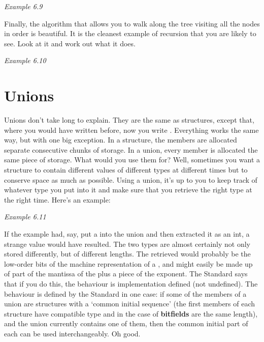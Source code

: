     \begin{center}\textit{Example 6.9}\end{center}


   Finally, the algorithm that allows you to walk along the tree visiting
    all the nodes in order is beautiful. It is the cleanest example of
    recursion that you are likely to see. Look at it and work out what it
    does.


    \begin{center}\textit{Example 6.10}\end{center}


  

 
        \section{Unions}
        

  

  Unions don't take long to explain. They are the same as structures, except
   that, where you would have written \struct{} before, now you write
   \union. Everything works the same way, but with one big
   exception. In a structure, the members are allocated separate consecutive
   chunks of storage. In a union, every member is allocated the same piece of
   storage. What would you use them for? Well, sometimes you want a structure
   to contain different values of different types at different times but to
   conserve space as much as possible. Using a union, it's up to you to keep
   track of whatever type you put into it and make sure that you retrieve the
   right type at the right time. Here's an example:


   \begin{center}\textit{Example 6.11}\end{center}


  If the example had, say, put a \float{} into the union and then
   extracted it as an int, a strange value would have resulted. The two types
   are almost certainly not only stored differently, but of different lengths.
   The \kint{} retrieved would probably be the low-order bits of the
   machine representation of a \float, and might easily be made up
   of part of the mantissa of the \float{} plus a piece of the
   exponent. The Standard says that if you do this, the behaviour is
   implementation defined (not undefined). The behaviour is defined by the
   Standard in one case: if some of the members of a union are structures with
   a `common initial sequence' (the first members of each structure have
   compatible type and in the case of \textbf{bitfields} are the same
   length), and the union currently contains one of them, then the common
   initial part of each can be used interchangeably. Oh good.



